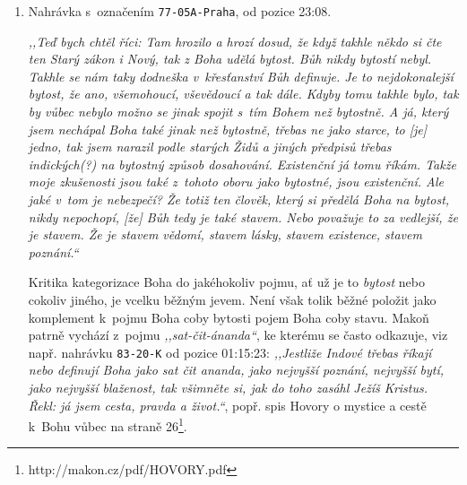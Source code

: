\begin{enumerate}

\item{%
Nahrávka s~označením \texttt{77-05A-Praha}, od pozice 23:08.

\textit{%
,,Teď bych chtěl říci: Tam hrozilo a hrozí dosud, že když takhle někdo si čte ten
Starý zákon i Nový, tak z Boha udělá bytost. Bůh nikdy bytostí nebyl. Takhle se
nám taky dodneška v~křesťanství Bůh definuje. Je to nejdokonalejší bytost, že
ano, všemohoucí, vševědoucí a tak dále. Kdyby tomu takhle bylo, tak by vůbec
nebylo možno se jinak spojit s~tím Bohem než bytostně. A já, který jsem nechápal
Boha také jinak než bytostně, třebas ne jako starce, to [je] jedno, tak jsem
narazil podle starých Židů a jiných předpisů třebas indických(?) na bytostný
způsob dosahování. Existenční já tomu říkám. Takže moje zkušenosti jsou také
z~tohoto oboru jako bytostné, jsou existenční. Ale jaké v~tom je nebezpečí? Že
totiž ten člověk, který si předělá Boha na bytost, nikdy nepochopí, [že] Bůh tedy je
také stavem. Nebo považuje to za vedlejší, že je stavem. Že je stavem vědomí,
stavem lásky, stavem existence, stavem poznání.``
}

Kritika kategorizace Boha do jakéhokoliv pojmu, ať už je to \textit{bytost} nebo
cokoliv jiného, je vcelku běžným jevem. Není však tolik běžné položit jako
komplement k~pojmu Boha coby bytosti pojem Boha coby stavu. Makoň patrně vychází
z~pojmu \textit{,,sat-čit-ánanda``}, ke kterému se často odkazuje, viz např.
nahrávku \texttt{83-20-K} od pozice 01:15:23: \textit{,,Jestliže Indové třebas
        říkají nebo definují Boha jako sat čit ananda, jako nejvyšší poznání,
        nejvyšší bytí, jako nejvyšší blaženost, tak všimněte si, jak do toho
        zasáhl Ježíš Kristus. Řekl: já jsem cesta, pravda a život.``}, popř.
        spis Hovory o mystice a cestě k~Bohu vůbec na straně
        26\footnote{http://makon.cz/pdf/HOVORY.pdf}.

}
\end{enumerate}

